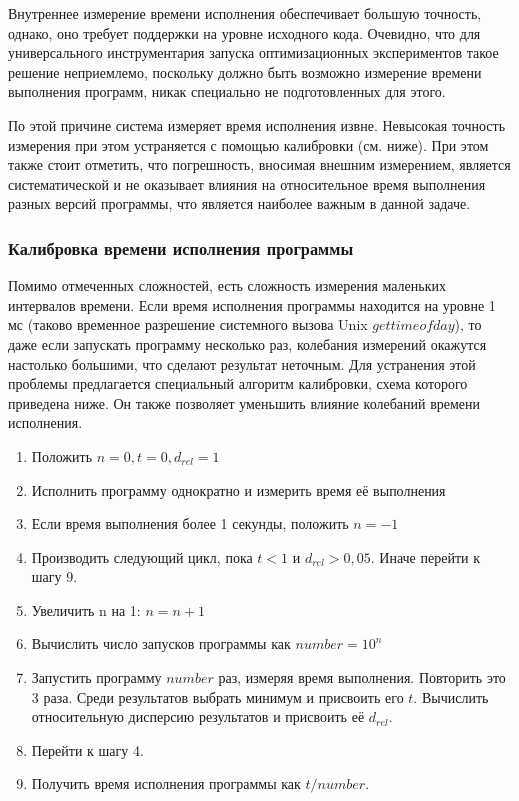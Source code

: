 Внутреннее измерение времени исполнения обеспечивает большую точность, однако, оно требует поддержки на уровне исходного кода. Очевидно, что для универсального инструментария запуска оптимизационных экспериментов такое решение неприемлемо, поскольку должно быть возможно измерение времени выполнения программ, никак специально не подготовленных для этого.

По этой причине система измеряет время исполнения извне. Невысокая точность измерения при этом устраняется с помощью калибровки (см. ниже). При этом также стоит отметить, что погрешность, вносимая внешним измерением, является систематической и не оказывает влияния на относительное время выполнения разных версий программы, что является наиболее важным в данной задаче.

\subsubsection{Калибровка времени исполнения программы}
Помимо отмеченных сложностей, есть сложность измерения маленьких интервалов времени. Если время исполнения программы находится на уровне 1 мс (таково временное разрешение системного вызова Unix $gettimeofday$), то даже если запускать программу несколько раз, колебания измерений окажутся настолько большими, что сделают результат неточным. Для устранения этой проблемы предлагается специальный алгоритм калибровки, схема которого приведена ниже. Он также позволяет уменьшить влияние колебаний времени исполнения.

\begin{enumerate}
    \item Положить $n = 0, t = 0, d_{rel} = 1$
    \item Исполнить программу однократно и измерить время её выполнения
    \item Если время выполнения более 1 секунды, положить $n = -1$
    \item Производить следующий цикл, пока $t < 1$ и $d_{rel} > 0,05$. Иначе перейти к шагу 9.
    \item Увеличить n на 1: $n = n + 1$
    \item Вычислить число запусков программы как $number = 10^{n}$
    \item Запустить программу $number$ раз, измеряя время выполнения. Повторить это 3 раза. Среди результатов выбрать минимум и присвоить его $t$. Вычислить относительную дисперсию результатов и присвоить её $d_{rel}$.
    \item Перейти к шагу 4.
    \item Получить время исполнения программы как $t / number$.
\end{enumerate}

